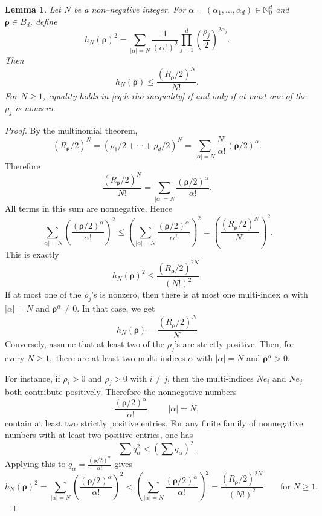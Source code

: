 \documentclass[12pt, reqno]{amsart}
\numberwithin{equation}{section}
\newtheorem{lemma}[theorem]{Lemma}
\begin{document}
\begin{lemma}
\label{lem:boundary-layer-comparison}
Let $N$ be a non--negative integer. For $\alpha=(\alpha_1,\ldots,\alpha_d)\in\mathbb{N}_{0}^{d}$ and $\boldsymbol{\rho}\in B_d$, define
\[
h_N(\boldsymbol{\rho})^{2}
=
\sum_{|\alpha|=N}
\frac{1}{(\alpha!)^{2}}
\prod_{j=1}^{d}
\left(\frac{\rho_j}{2}\right)^{2\alpha_j}.
\] Then
\begin{equation} \label{eq:h-rho inequality}
h_N(\boldsymbol{\rho})
\leq
\frac{(R_{\boldsymbol{\rho}}/2)^N}{N!}.
\end{equation}
For $N\geq1$, equality holds in \eqref{eq:h-rho inequality} if and only if at most one of the $\rho_j$ is nonzero.
\end{lemma}
\begin{proof}
By the multinomial theorem,
\[
(R_{\boldsymbol{\rho}}/2)^N
=
(\rho_1/2+\cdots+\rho_d/2)^N
=
\sum_{|\alpha|=N}
\frac{N!}{\alpha!}(\boldsymbol{\rho}/2)^{\alpha}.
\]
Therefore
\[
\frac{(R_{\boldsymbol{\rho}}/2)^N}{N!}
=
\sum_{|\alpha|=N}
\frac{(\boldsymbol{\rho}/2)^{\alpha}}{\alpha!}.
\]
All terms in this sum are nonnegative. Hence
\[
\sum_{|\alpha|=N}
\left(\frac{(\boldsymbol{\rho}/2)^{\alpha}}{\alpha!}\right)^2
\leq
\left(
\sum_{|\alpha|=N}
\frac{(\boldsymbol{\rho}/2)^{\alpha}}{\alpha!}
\right)^2
= \left(\frac{(R_{\boldsymbol{\rho}}/2)^N}{N!}\right)^2.
\]
This is exactly
\[
h_N(\boldsymbol{\rho})^{2}
\leq
\frac{(R_{\boldsymbol{\rho}}/2)^{2N}}{(N!)^{2}}.
\]
If at most one of the \(\rho_j\)'s is nonzero, then there is at most one multi-index \(\alpha\) with $|\alpha|=N$  and
$\boldsymbol{\rho}^{\alpha}\neq 0.$ In that case, we get
\[
h_N(\boldsymbol{\rho})
=
\frac{(R_{\boldsymbol{\rho}}/2)^N}{N!}
\]
Conversely, assume that at least two of the \(\rho_j\)'s are strictly positive. Then, for every $N\geq 1,$ there are at least two multi-indices \(\alpha\) with $|\alpha|=N$ and
$\boldsymbol{\rho}^{\alpha}>0.$

For instance, if \(\rho_i>0\) and \(\rho_j>0\) with \(i\neq j\), then the multi-indices $Ne_i  \text{ and } Ne_j$
both contribute positively. Therefore the nonnegative numbers
\[
\frac{(\boldsymbol{\rho}/2)^{\alpha}}{\alpha!},
\qquad
|\alpha|=N,
\]
contain at least two strictly positive entries. For any finite family of nonnegative numbers with at least two positive entries, one has
\[
\sum q_{\alpha}^{2}
<
\left(\sum q_{\alpha}\right)^{2}.
\]
Applying this to
$q_{\alpha}=\frac{(\boldsymbol{\rho}/2)^{\alpha}}{\alpha!}$
gives
\[
h_N(\boldsymbol{\rho})^{2}
=
\sum_{|\alpha|=N}
\left(\frac{(\boldsymbol{\rho}/2)^{\alpha}}{\alpha!}\right)^2
<
\left(
\sum_{|\alpha|=N}
\frac{(\boldsymbol{\rho}/2)^{\alpha}}{\alpha!}
\right)^2
=
\frac{(R_{\boldsymbol{\rho}}/2)^{2N}}{(N!)^{2}}
\qquad
\text{for }N\geq 1.
\]

\end{proof}
\end{document}
